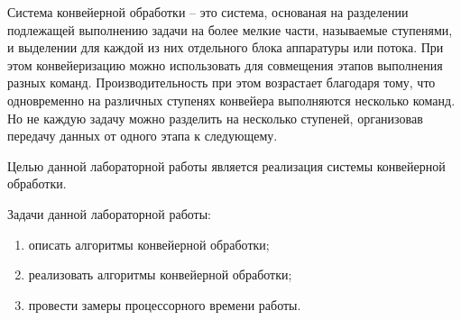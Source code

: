 \Introduction  
    Система конвейерной обработки -- это система, 
    основаная на разделении подлежащей выполнению задачи на более мелкие части,
    называемые ступенями, и выделении для каждой из них отдельного блока аппаратуры или потока.
    При этом конвейеризацию можно использовать для совмещения этапов выполнения разных команд. 
    Производительность при этом возрастает благодаря тому,
    что одновременно на различных ступенях конвейера выполняются несколько команд.
    Но не каждую задачу можно разделить на несколько ступеней,
    организовав передачу данных от одного этапа к следующему.

    
    Целью данной лабораторной работы является реализация системы конвейерной обработки.

    Задачи данной лабораторной работы:
    \begin{enumerate}
        \item описать алгоритмы конвейерной обработки;
        \item реализовать алгоритмы конвейерной обработки;
        \item провести замеры процессорного времени работы.
    \end{enumerate}

\newpage